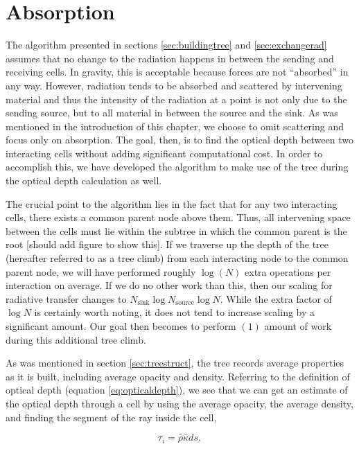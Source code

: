 \section{Absorption}
\label{sec:absorption}

The algorithm presented in sections \ref{sec:buildingtree} and \ref{sec:exchangerad} assumes that no change to the radiation happens in between the sending and receiving cells. In gravity, this is acceptable because forces are not ``absorbed'' in any way. However, radiation tends to be absorbed and scattered by intervening material and thus the intensity of the radiation at a point is not only due to the sending source, but to all material in between the source and the sink. As was mentioned in the introduction of this chapter, we choose to omit scattering and focus only on absorption. The goal, then, is to find the optical depth between two interacting cells without adding significant computational cost. In order to accomplish this, we have developed the algorithm to make use of the tree during the optical depth calculation as well.

The crucial point to the algorithm lies in the fact that for any two interacting cells, there exists a common parent node above them. Thus, all intervening space between the cells must lie within the subtree in which the common parent is the root [should add figure to show this]. If we traverse up the depth of the tree (hereafter referred to as a tree climb) from each interacting node to the common parent node, we will have performed roughly $\log(N)$ extra operations per interaction on average. If we do no other work than this, then our scaling for radiative transfer changes to $N_{\mbox{sink}}\log{N_{\mbox{source}}}\log{N}$. While the extra factor of $\log{N}$ is certainly worth noting, it does not tend to increase scaling by a significant amount. Our goal then becomes to perform $\mathcal{(1)}$ amount of work during this additional tree climb.

As was mentioned in section \ref{sec:treestruct}, the tree records average properties as it is built, including average opacity and density. Referring to the definition of optical depth (equation \ref{eq:opticaldepth}), we see that we can get an estimate of the optical depth through a cell by using the average opacity, the average density, and finding the segment of the ray inside the cell,

\begin{equation}
\label{eq:averageopticaldepth}
\tau_i = \bar{\rho}\bar{\kappa}ds,
\end{equation}

